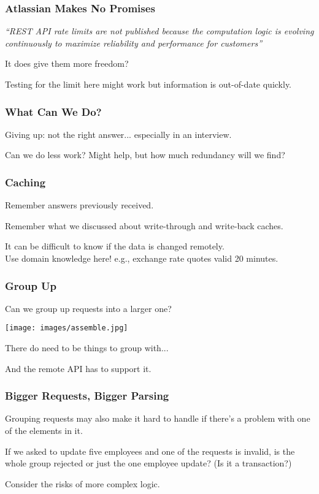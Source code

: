 \begin{frame}
\frametitle{Atlassian Makes No Promises}

\textit{``REST API rate limits are not published because the computation logic is evolving continuously to maximize reliability and performance for customers'' }

It does give them more freedom?

Testing for the limit here might work but information is out-of-date quickly.

\end{frame}

\begin{frame}
\frametitle{What Can We Do?}

Giving up: not the right answer... especially in an interview.

Can we do less work? Might help, but how much redundancy will we find?

\end{frame}

\begin{frame}
\frametitle{Caching}

Remember answers previously received. 

Remember what we discussed about write-through and write-back caches.

It can be difficult to know if the data is changed remotely.\\
\quad Use domain knowledge here! e.g., exchange rate quotes valid 20 minutes.

\end{frame}

\begin{frame}
\frametitle{Group Up}

Can we group up requests into a larger one?

\begin{center}
  \texttt{[image: images/assemble.jpg]}
\end{center}

There do need to be things to group with...

And the remote API has to support it.

\end{frame}

\begin{frame}
\frametitle{Bigger Requests, Bigger Parsing}

Grouping requests may also make it hard to handle if there's a problem with one of the elements in it. 

If we asked to update five employees and one of the requests is invalid, is the whole group rejected or just the one employee update? (Is it a transaction?)

Consider the risks of more complex logic.

\end{frame}

